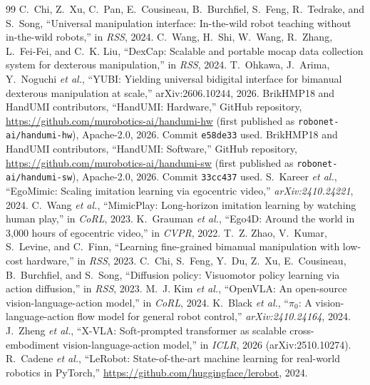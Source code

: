 \documentclass[conference,10pt]{IEEEtran}
\begin{document}
\begin{thebibliography}{99}\footnotesize
{} C.~Chi, Z.~Xu, C.~Pan, E.~Cousineau, B.~Burchfiel, S.~Feng, R.~Tedrake, and S.~Song, ``Universal manipulation interface: In-the-wild robot teaching without in-the-wild robots,'' in \emph{RSS}, 2024.
 C.~Wang, H.~Shi, W.~Wang, R.~Zhang, L.~Fei-Fei, and C.~K. Liu, ``DexCap: Scalable and portable mocap data collection system for dexterous manipulation,'' in \emph{RSS}, 2024.
 T.~Ohkawa, J.~Arima, Y.~Noguchi \emph{et al.}, ``YUBI: Yielding universal bidigital interface for bimanual dexterous manipulation at scale,'' arXiv:2606.10244, 2026.
 BrikHMP18 and HandUMI contributors, ``HandUMI: Hardware,'' GitHub repository, \url{https://github.com/murobotics-ai/handumi-hw} (first published as \texttt{robonet-ai/handumi-hw}), Apache-2.0, 2026. Commit \texttt{e58de33} used.
 BrikHMP18 and HandUMI contributors, ``HandUMI: Software,'' GitHub repository, \url{https://github.com/murobotics-ai/handumi-sw} (first published as \texttt{robonet-ai/handumi-sw}), Apache-2.0, 2026. Commit \texttt{33cc437} used.
 S.~Kareer \emph{et al.}, ``EgoMimic: Scaling imitation learning via egocentric video,'' \emph{arXiv:2410.24221}, 2024.
 C.~Wang \emph{et al.}, ``MimicPlay: Long-horizon imitation learning by watching human play,'' in \emph{CoRL}, 2023.
 K.~Grauman \emph{et al.}, ``Ego4D: Around the world in 3,000 hours of egocentric video,'' in \emph{CVPR}, 2022.
 T.~Z. Zhao, V.~Kumar, S.~Levine, and C.~Finn, ``Learning fine-grained bimanual manipulation with low-cost hardware,'' in \emph{RSS}, 2023.
 C.~Chi, S.~Feng, Y.~Du, Z.~Xu, E.~Cousineau, B.~Burchfiel, and S.~Song, ``Diffusion policy: Visuomotor policy learning via action diffusion,'' in \emph{RSS}, 2023.
 M.~J. Kim \emph{et al.}, ``OpenVLA: An open-source vision-language-action model,'' in \emph{CoRL}, 2024.
 K.~Black \emph{et al.}, ``$\pi_0$: A vision-language-action flow model for general robot control,'' \emph{arXiv:2410.24164}, 2024.
 J.~Zheng \emph{et al.}, ``X-VLA: Soft-prompted transformer as scalable cross-embodiment vision-language-action model,'' in \emph{ICLR}, 2026 (arXiv:2510.10274).
 R.~Cadene \emph{et al.}, ``LeRobot: State-of-the-art machine learning for real-world robotics in PyTorch,'' \url{https://github.com/huggingface/lerobot}, 2024.

\end{thebibliography}
\end{document}
